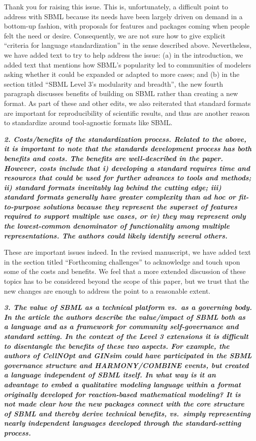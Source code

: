 \documentclass[11pt]{mhletter}
\begin{document}
Thank you for raising this issue.  This is, unfortunately, a difficult point to address with SBML because its needs have been largely driven on demand in a bottom-up fashion, with proposals for features and packages coming when people felt the need or desire.  Consequently, we are not sure how to give explicit ``criteria for language standardization'' in the sense described above.  Nevertheless, we have added text to try to help address the issue: (a) in the introduction, we added text that mentions how SBML's popularity led to communities of modelers asking whether it could be expanded or adapted to more cases; and (b) in the section titled ``SBML Level 3's modularity and breadth'', the new fourth paragraph discusses benefits of building on SBML rather than creating a new format.  As part of these and other edits, we also reiterated that standard formats are important for reproducibility of scientific results, and thus are another reason to standardize around tool-agnostic formats like SBML.


\textbf{\textit{2. Costs/benefits of the standardization process. Related to the above, it is important to note that the standards development process has both benefits and costs. The benefits are well-described in the paper. However, costs include that i) developing a standard requires time and resources that could be used for further advances to tools and methods; ii) standard formats inevitably lag behind the cutting edge; iii) standard formats generally have greater complexity than ad hoc or fit-to-purpose solutions because they represent the superset of features required to support multiple use cases, or iv) they may represent only the lowest-common denominator of functionality among multiple representations. The authors could likely identify several others.}}

These are important issues indeed.  In the revised manuscript, we have added text in the section titled ``Forthcoming challenges'' to acknowledge and touch upon some of the costs and benefits.  We feel that a more extended discussion of these topics has to be considered beyond the scope of this paper, but we trust that the new changes are enough to address the point to a reasonable extent.


\textbf{\textit{3. The value of SBML as a technical platform vs.\ as a governing body.  In the article the authors describe the value/impact of SBML both as a language and as a framework for community self-governance and standard setting. In the context of the Level 3 extensions it is difficult to disentangle the benefits of these two aspects. For example, the authors of CellNOpt and GINsim could have participated in the SBML governance structure and HARMONY/COMBINE events, but created a language independent of SBML itself. In what way is it an advantage to embed a qualitative modeling language within a format originally developed for reaction-based mathematical modeling? It is not made clear how the new packages connect with the core structure of SBML and thereby derive technical benefits, vs.\ simply representing nearly independent languages developed through the standard-setting process.}}
\end{document}
